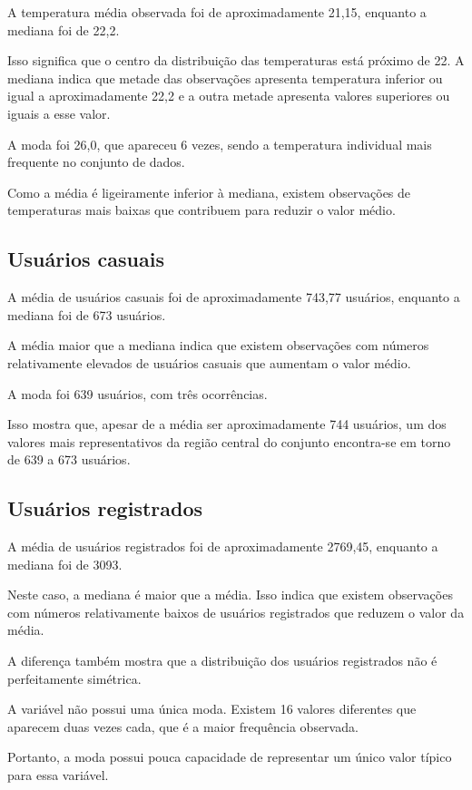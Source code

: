 \documentclass[12pt,a4paper]{article}
\begin{document}
A temperatura média observada foi de aproximadamente 21,15, enquanto a
mediana foi de 22,2.

Isso significa que o centro da distribuição das temperaturas está próximo
de 22. A mediana indica que metade das observações apresenta temperatura
inferior ou igual a aproximadamente 22,2 e a outra metade apresenta valores
superiores ou iguais a esse valor.

A moda foi 26,0, que apareceu 6 vezes, sendo a temperatura individual mais
frequente no conjunto de dados.

Como a média é ligeiramente inferior à mediana, existem observações de
temperaturas mais baixas que contribuem para reduzir o valor médio.

\subsection{Usuários casuais}

A média de usuários casuais foi de aproximadamente 743,77 usuários, enquanto
a mediana foi de 673 usuários.

A média maior que a mediana indica que existem observações com números
relativamente elevados de usuários casuais que aumentam o valor médio.

A moda foi 639 usuários, com três ocorrências.

Isso mostra que, apesar de a média ser aproximadamente 744 usuários, um dos
valores mais representativos da região central do conjunto encontra-se em
torno de 639 a 673 usuários.

\subsection{Usuários registrados}

A média de usuários registrados foi de aproximadamente 2769,45, enquanto a
mediana foi de 3093.

Neste caso, a mediana é maior que a média. Isso indica que existem
observações com números relativamente baixos de usuários registrados que
reduzem o valor da média.

A diferença também mostra que a distribuição dos usuários registrados não é
perfeitamente simétrica.

A variável não possui uma única moda. Existem 16 valores diferentes que
aparecem duas vezes cada, que é a maior frequência observada.

Portanto, a moda possui pouca capacidade de representar um único valor
típico para essa variável.
\end{document}
